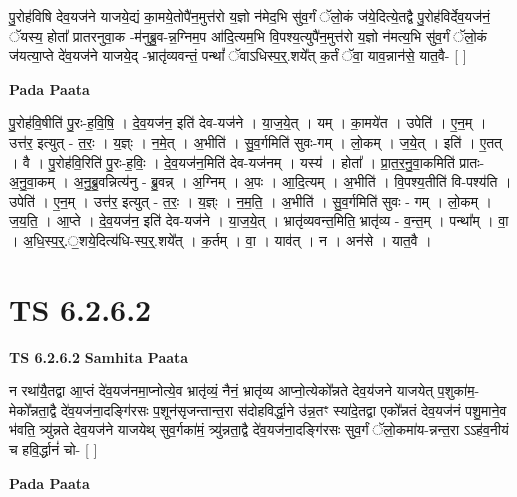 \documentclass[17pt]{extarticle}
\begin{document}
पु॒रोह॑विषि देव॒यज॑ने याजये॒द्यं का॒मये॒तोपै॑न॒मुत्त॑रो य॒ज्ञो न॑मेद॒भि सु॑व॒र्गं ॅलो॒कं ज॑ये॒दित्ये॒तद्वै पु॒रोह॑विर्देव॒यज॑नं॒ ॅयस्य॒ होता᳚ प्रातरनुवा॒क -म॑नुब्रु॒व-न्न॒ग्निम॒प आ॑दि॒त्यम॒भि वि॒पश्य॒त्युपै॑न॒मुत्त॑रो य॒ज्ञो न॑मत्य॒भि सु॑व॒र्गं ॅलो॒कं ज॑यत्या॒प्ते दे॑व॒यज॑ने याजये॒द् -भ्रातृ॑व्यवन्तं॒ पन्थां᳚ ॅवाऽधिस्प॒र्॒.शये᳚त् क॒र्तं ॅवा॒ याव॒न्नान॑से॒ यात॒वै- [  ] \newline

\textbf{Pada Paata} \newline

पु॒रोह॑वि॒षीति॑ पु॒रः-ह॒वि॒षि॒ । दे॒व॒यज॑न॒ इति॑ देव-यज॑ने । या॒ज॒ये॒त् । यम् । का॒मये॑त । उपेति॑ । ए॒न॒म् । उत्त॑र॒ इत्युत् - त॒रः॒ । य॒ज्ञ्ः । न॒मे॒त् । अ॒भीति॑ । सु॒व॒र्गमिति॑ सुवः-गम् । लो॒कम् । ज॒ये॒त् । इति॑ । ए॒तत् । वै । पु॒रोह॑वि॒रिति॑ पु॒रः-ह॒विः॒ । दे॒व॒यज॑न॒मिति॑ देव-यज॑नम् । यस्य॑ । होता᳚ । प्रा॒त॒र॒नु॒वा॒कमिति॑ प्रातः-अ॒नु॒वा॒कम् । अ॒नु॒ब्रु॒वन्नित्य॑नु - ब्रु॒वन्न् । अ॒ग्निम् । अ॒पः । आ॒दि॒त्यम् । अ॒भीति॑ । वि॒पश्य॒तीति॑ वि-पश्य॑ति । उपेति॑ । ए॒न॒म् । उत्त॑र॒ इत्युत् - त॒रः॒ । य॒ज्ञ्ः । न॒म॒ति॒ । अ॒भीति॑ । सु॒व॒र्गमिति॑ सुवः - गम् । लो॒कम् । ज॒य॒ति॒ । आ॒प्ते । दे॒व॒यज॑न॒ इति॑ देव-यज॑ने । या॒ज॒ये॒त् । भ्रातृ॑व्यवन्त॒मिति॒ भ्रातृ॑व्य - व॒न्त॒म् । पन्था᳚म् । वा॒ । अ॒धि॒स्प॒र्॒.॒शये॒दित्य॑धि-स्प॒र्॒.शये᳚त् । क॒र्तम् । वा॒ । याव॑त् । न । अन॑से । यात॒वै ।  \newline





\section{ TS 6.2.6.2 }

\textbf{TS 6.2.6.2 } \newline
\textbf{Samhita Paata} \newline

न रथा॑यै॒तद्वा आ॒प्तं दे॑व॒यज॑नमा॒प्नोत्ये॒व भ्रातृ॑व्यं॒ नैनं॒ भ्रातृ॑व्य आप्नो॒त्येको᳚न्नते देव॒य॑जने याजयेत् प॒शुका॑म॒-मेको᳚न्नता॒द्वै दे॑व॒यज॑ना॒दङ्गि॑रसः प॒शून॑सृजन्तान्त॒रा स॑दोहविर्द्धा॒ने उ॑न्न॒तꣳ स्या॑दे॒तद्वा एको᳚न्नतं देव॒यज॑नं पशु॒माने॒व भ॑वति॒ त्र्यु॑न्नते देव॒यज॑ने याजयेथ् सुव॒र्गका॑मं॒ त्र्यु॑न्नता॒द्वै दे॑व॒यज॑ना॒दङ्गि॑रसः सुव॒र्गं ॅलो॒कमा॑य-न्नन्त॒रा ऽऽह॑व॒नीयं च हवि॒र्द्धानं॑ चो- [  ] \newline

\textbf{Pada Paata} \newline
\end{document}
